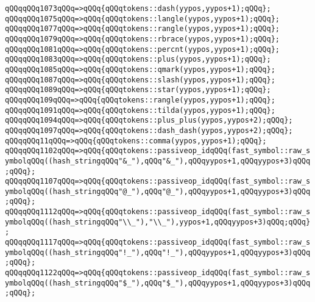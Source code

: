 \verb|qQQqqQQq1073qQQq=>qQQq{qQQqtokens::dash(yypos,yypos+1);qQQq};|\newline
\verb|qQQqqQQq1075qQQq=>qQQq{qQQqtokens::langle(yypos,yypos+1);qQQq};|\newline
\verb|qQQqqQQq1077qQQq=>qQQq{qQQqtokens::rangle(yypos,yypos+1);qQQq};|\newline
\verb|qQQqqQQq1079qQQq=>qQQq{qQQqtokens::rbrace(yypos,yypos+1);qQQq};|\newline
\verb|qQQqqQQq1081qQQq=>qQQq{qQQqtokens::percnt(yypos,yypos+1);qQQq};|\newline
\verb|qQQqqQQq1083qQQq=>qQQq{qQQqtokens::plus(yypos,yypos+1);qQQq};|\newline
\verb|qQQqqQQq1085qQQq=>qQQq{qQQqtokens::qmark(yypos,yypos+1);qQQq};|\newline
\verb|qQQqqQQq1087qQQq=>qQQq{qQQqtokens::slash(yypos,yypos+1);qQQq};|\newline
\verb|qQQqqQQq1089qQQq=>qQQq{qQQqtokens::star(yypos,yypos+1);qQQq};|\newline
\verb|qQQqqQQq109qQQq=>qQQq{qQQqtokens::rangle(yypos,yypos+1);qQQq};|\newline
\verb|qQQqqQQq1091qQQq=>qQQq{qQQqtokens::tilda(yypos,yypos+1);qQQq};|\newline
\verb|qQQqqQQq1094qQQq=>qQQq{qQQqtokens::plus_plus(yypos,yypos+2);qQQq};|\newline
\verb|qQQqqQQq1097qQQq=>qQQq{qQQqtokens::dash_dash(yypos,yypos+2);qQQq};|\newline
\verb|qQQqqQQq11qQQq=>qQQq{qQQqtokens::comma(yypos,yypos+1);qQQq};|\newline
\verb|qQQqqQQq1102qQQq=>qQQq{qQQqtokens::passiveop_idqQQq(fast_symbol::raw_symbolqQQq((hash_stringqQQq"&_"),qQQq"&_"),qQQqyypos+1,qQQqyypos+3)qQQq;qQQq};|\newline
\verb|qQQqqQQq1107qQQq=>qQQq{qQQqtokens::passiveop_idqQQq(fast_symbol::raw_symbolqQQq((hash_stringqQQq"@_"),qQQq"@_"),qQQqyypos+1,qQQqyypos+3)qQQq;qQQq};|\newline
\verb|qQQqqQQq1112qQQq=>qQQq{qQQqtokens::passiveop_idqQQq(fast_symbol::raw_symbolqQQq((hash_stringqQQq"\\_"),"\\_"),yypos+1,qQQqyypos+3)qQQq;qQQq};|\newline
\verb|qQQqqQQq1117qQQq=>qQQq{qQQqtokens::passiveop_idqQQq(fast_symbol::raw_symbolqQQq((hash_stringqQQq"!_"),qQQq"!_"),qQQqyypos+1,qQQqyypos+3)qQQq;qQQq};|\newline
\verb|qQQqqQQq1122qQQq=>qQQq{qQQqtokens::passiveop_idqQQq(fast_symbol::raw_symbolqQQq((hash_stringqQQq"$_"),qQQq"$_"),qQQqyypos+1,qQQqyypos+3)qQQq;qQQq};|\newline
